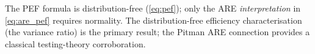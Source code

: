 \noindent The PEF formula is distribution-free (\cref{eq:pef}); only the ARE \emph{interpretation} in \cref{eq:are_pef} requires normality. The distribution-free efficiency characterisation (the variance ratio) is the primary result; the Pitman ARE connection provides a classical testing-theory corroboration.
